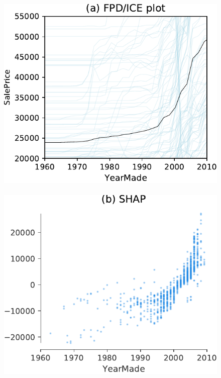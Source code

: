 \documentclass[smallextended]{svjour3}       %
\newcommand{\cut}[1]{}
\begin{document}
\cut{
pregnant female at max range [233.33467678]
pregnant female in male height range [228.71359869]
nonpregnant female in male height range [209.88006493]
male in male height range [219.46772083]
}


\cut{
$1/n*\sum_{i=1}^n f(x_j = pregnant, x_{i, \bar{j}}) - f(x_j = not pregnant, x_{i, \bar{j}})$

\noindent where ${x_{i, \bar{j}}: i=1,2,?,n}$ are the n training observations of $x_{\bar{j}}$
}

\begin{figure}[!htbp]
\begin{center}
\includegraphics[scale=0.28]{images/bulldozer_YearMade_pdp.pdf}~~
\includegraphics[scale=0.29]{images/bulldozer_YearMade_shap.pdf}~~

\end{center}
\end{figure}
\end{document}
